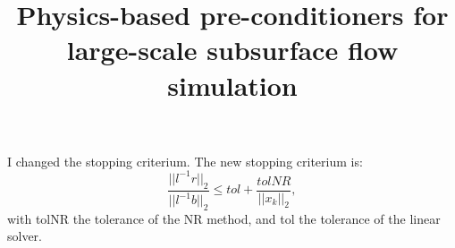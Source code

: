 \documentclass[12pt]{report}
\title{Physics-based pre-conditioners for large-scale subsurface flow simulation}
\begin{document}
\thispagestyle{empty}







I changed the stopping criterium. The new stopping criterium is:
$$\frac{||l^{-1}r||_2}{||l^{-1}b||_2}\leq tol+\frac{tolNR}{||x_k||_2},$$
with tolNR the tolerance of the NR method, and tol the tolerance of the linear solver.
\end{document}
